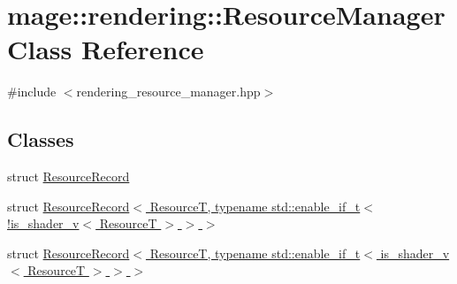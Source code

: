 \hypertarget{classmage_1_1rendering_1_1_resource_manager}{}\section{mage\+:\+:rendering\+:\+:Resource\+Manager Class Reference}
\label{classmage_1_1rendering_1_1_resource_manager}


{\ttfamily \#include $<$rendering\+\_\+resource\+\_\+manager.\+hpp$>$}

\subsection*{Classes}
\begin{DoxyCompactItemize}
\item 
struct \hyperlink{structmage_1_1rendering_1_1_resource_manager_1_1_resource_record}{Resource\+Record}
\item 
struct \hyperlink{structmage_1_1rendering_1_1_resource_manager_1_1_resource_record_3_01_resource_t_00_01typename_0d1bec05cbaa53974b1eda0724091f851}{Resource\+Record$<$ Resource\+T, typename std\+::enable\+\_\+if\+\_\+t$<$ !is\+\_\+shader\+\_\+v$<$ Resource\+T $>$ $>$ $>$}
\item 
struct \hyperlink{structmage_1_1rendering_1_1_resource_manager_1_1_resource_record_3_01_resource_t_00_01typename_09b062ee4b0394619806084252c69f48d}{Resource\+Record$<$ Resource\+T, typename std\+::enable\+\_\+if\+\_\+t$<$ is\+\_\+shader\+\_\+v$<$ Resource\+T $>$ $>$ $>$}
\end{DoxyCompactItemize}
